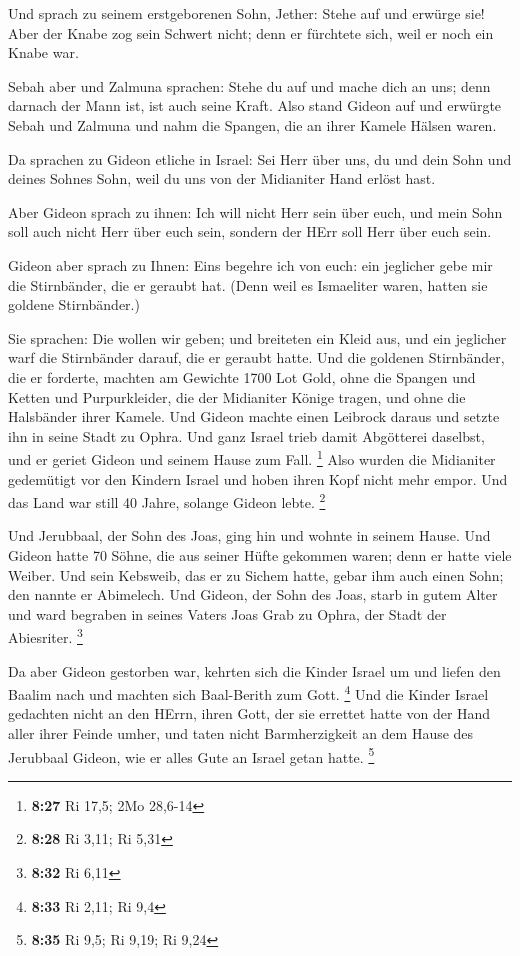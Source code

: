  Und sprach zu seinem erstgeborenen Sohn, Jether: Stehe auf
und erwürge sie! Aber der Knabe zog sein Schwert nicht; denn er
fürchtete sich, weil er noch ein Knabe war.

 Sebah aber und Zalmuna sprachen: Stehe du auf und mache
dich an uns; denn darnach der Mann ist, ist auch seine Kraft. Also stand
Gideon auf und erwürgte Sebah und Zalmuna und nahm die Spangen, die an
ihrer Kamele Hälsen waren.

 Da sprachen zu Gideon etliche in Israel: Sei Herr über
uns, du und dein Sohn und deines Sohnes Sohn, weil du uns von der
Midianiter Hand erlöst hast.

 Aber Gideon sprach zu ihnen: Ich will nicht Herr sein über
euch, und mein Sohn soll auch nicht Herr über euch sein, sondern der
HErr soll Herr über euch sein.

 Gideon aber sprach zu Ihnen: Eins begehre ich von euch:
ein jeglicher gebe mir die Stirnbänder, die er geraubt hat. (Denn weil
es Ismaeliter waren, hatten sie goldene Stirnbänder.)

 Sie sprachen: Die wollen wir geben; und breiteten ein
Kleid aus, und ein jeglicher warf die Stirnbänder darauf, die er geraubt
hatte.  Und die goldenen Stirnbänder, die er forderte,
machten am Gewichte 1700 Lot Gold, ohne die Spangen und Ketten und
Purpurkleider, die der Midianiter Könige tragen, und ohne die Halsbänder
ihrer Kamele.  Und Gideon machte einen Leibrock daraus und
setzte ihn in seine Stadt zu Ophra. Und ganz Israel trieb damit
Abgötterei daselbst, und er geriet Gideon und seinem Hause zum Fall.
\footnote{\textbf{8:27} Ri 17,5; 2Mo 28,6-14}  Also wurden
die Midianiter gedemütigt vor den Kindern Israel und hoben ihren Kopf
nicht mehr empor. Und das Land war still 40 Jahre, solange Gideon lebte.
\footnote{\textbf{8:28} Ri 3,11; Ri 5,31}

 Und Jerubbaal, der Sohn des Joas, ging hin und wohnte in
seinem Hause.  Und Gideon hatte 70 Söhne, die aus seiner
Hüfte gekommen waren; denn er hatte viele Weiber.  Und sein
Kebsweib, das er zu Sichem hatte, gebar ihm auch einen Sohn; den nannte
er Abimelech.  Und Gideon, der Sohn des Joas, starb in
gutem Alter und ward begraben in seines Vaters Joas Grab zu Ophra, der
Stadt der Abiesriter. \footnote{\textbf{8:32} Ri 6,11}

 Da aber Gideon gestorben war, kehrten sich die Kinder
Israel um und liefen den Baalim nach und machten sich Baal-Berith zum
Gott. \footnote{\textbf{8:33} Ri 2,11; Ri 9,4}  Und die
Kinder Israel gedachten nicht an den HErrn, ihren Gott, der sie errettet
hatte von der Hand aller ihrer Feinde umher,  und taten
nicht Barmherzigkeit an dem Hause des Jerubbaal Gideon, wie er alles
Gute an Israel getan hatte. \footnote{\textbf{8:35} Ri 9,5; Ri 9,19; Ri
  9,24}

